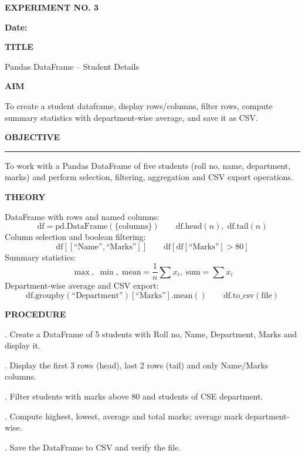 \documentclass[11pt,twoside]{article}
\newcommand{\expheading}[1]{{\fontsize{14}{17}\selectfont\textbf{#1}\par}}
\newcommand{\fullrule}{\noindent\rule{\textwidth}{0.6pt}\par}
\begin{document}
\sloppy

{\setlength{\parskip}{1pt}\setlength{\abovedisplayskip}{2pt}\setlength{\belowdisplayskip}{2pt}
\begin{center}
\expheading{EXPERIMENT NO. 3}
\end{center}
\vspace{2pt}

\noindent\textbf{Date:} \underline{\hspace{2.6cm}}\par
\vspace{6pt}

\expheading{TITLE}
\vspace{4pt}
\noindent Pandas DataFrame -- Student Details\par
\vspace{4pt}

\expheading{AIM}
\vspace{4pt}
\noindent To create a student dataframe, display rows/columns, filter rows, compute summary statistics with department-wise average, and save it as CSV. \par
\vspace{4pt}

\expheading{OBJECTIVE}
\vspace{2pt}
\fullrule
\vspace{4pt}
\noindent To work with a Pandas DataFrame of five students (roll no, name, department, marks) and perform selection, filtering, aggregation and CSV export operations. \par
\vspace{4pt}

\expheading{THEORY}
\vspace{4pt}
DataFrame with rows and named columns:
\[\text{df}=\text{pd.DataFrame}(\{\text{columns}\})\qquad\text{df.head}(n),\; \text{df.tail}(n)\]
Column selection and boolean filtering:
\[\text{df}[[\text{``Name''},\text{``Marks''}]]\qquad \text{df}[\text{df}[\text{``Marks''}]>80]\]
Summary statistics:
\[\max,\; \min,\; \text{mean}=\frac{1}{n}\sum x_i,\; \text{sum}=\sum x_i\]
Department-wise average and CSV export:
\[\text{df.groupby}(\text{``Department''})[\text{``Marks''}].\text{mean}()\qquad \text{df.to\_csv}(\text{file})\]
\vspace{4pt}

\expheading{PROCEDURE}
\vspace{4pt}
. Create a DataFrame of 5 students with Roll no, Name, Department, Marks and display it.\par
{}. Display the first 3 rows (head), last 2 rows (tail) and only Name/Marks columns.\par
{}. Filter students with marks above 80 and students of CSE department.\par
{}. Compute highest, lowest, average and total marks; average mark department-wise.\par
{}. Save the DataFrame to CSV and verify the file. \par
\vspace{4pt}

}
\end{document}
